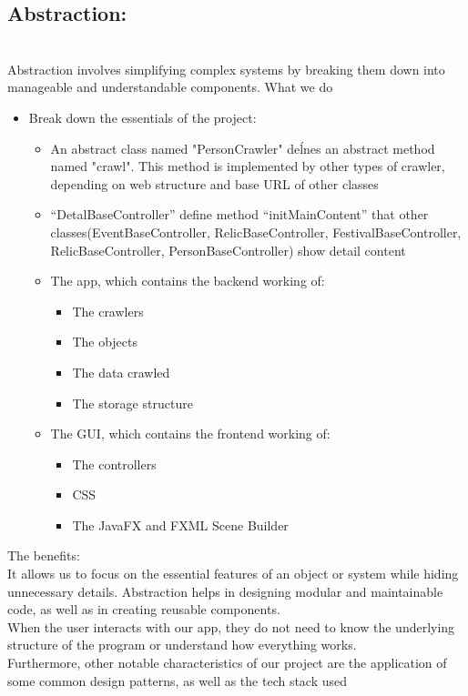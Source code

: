\documentclass[a4paper,10pt,notitlepage]{article}
\begin{document}
{\subsection{Abstraction:}\\
Abstraction involves simplifying complex systems by breaking them down into
manageable and understandable components.
What we do
\begin{itemize}
    \item Break down the essentials of the project:
    \begin{itemize}
        \item An abstract class named "PersonCrawler" deĺnes an abstract
method named "crawl". This method is implemented by other types
of crawler, depending on web structure and base URL of other
classes
\item “DetalBaseController” define method “initMainContent” that other
classes(EventBaseController, RelicBaseController,
FestivalBaseController, RelicBaseController,
PersonBaseController) show detail content
\item The app, which contains the backend working of:
\begin{itemize}
    \item The crawlers
    \item The objects
    \item The data crawled
    \item The storage structure
\end{itemize}
\item The GUI, which contains the frontend working of:
\begin{itemize}
    \item The controllers
    \item CSS
    \item The JavaFX and FXML Scene Builder
\end{itemize}
    \end{itemize}
\end{itemize}
The benefits:\\
It allows us to focus on the essential features of an object or system while hiding
unnecessary details. Abstraction helps in designing modular and maintainable
code, as well as in creating reusable components.\\
When the user interacts with our app, they do not need to know the underlying
structure of the program or understand how everything works.\\
Furthermore, other notable characteristics of our project are the application of some
common design patterns, as well as the tech stack used
}
\end{document}
